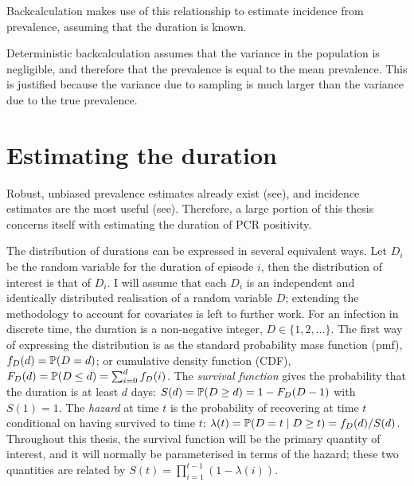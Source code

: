 \documentclass[thesis.tex]{subfiles}
\begin{document}
Backcalculation makes use of this relationship to estimate incidence from prevalence, assuming that the duration is known.

Deterministic backcalculation assumes that the variance in the population is negligible, and therefore that the prevalence is equal to the mean prevalence.
This is justified because the variance due to sampling is much larger than the variance due to the true prevalence.

\section{Estimating the duration}

Robust, unbiased prevalence estimates already exist (see), and incidence estimates are the most useful (see).
Therefore, a large portion of this thesis concerns itself with estimating the duration of PCR positivity.

The distribution of durations can be expressed in several equivalent ways.
Let $D_i$ be the random variable for the duration of episode $i$, then the distribution of interest is that of $D_i$.
I will assume that each $D_i$ is an independent and identically distributed realisation of a random variable $D$; extending the methodology to account for covariates is left to further work.
For an infection in discrete time, the duration is a non-negative integer, \ie $D \in \{1, 2, \dots\}$.
The first way of expressing the distribution is as the standard probability mass function (pmf), $f_{D}(d) = \operatorname{\mathbb{P}}(D = d)$; or cumulative density function (CDF), $F_{D}(d) = \operatorname{\mathbb{P}}(D \leq d) = \sum_{i=0}^d f_{D}(i)$.
The \emph{survival function} gives the probability that the duration is at least $d$ days: $S(d) = \operatorname{\mathbb{P}}(D \geq d) = 1 - F_{D}(D - 1)$ with $S(1) = 1$.
The \emph{hazard} at time $t$ is the probability of recovering at time $t$ conditional on having survived to time $t$: $\lambda(t) = \operatorname{\mathbb{P}}(D = t \mid D \geq t) = f_{D}(d) / S(d)$.
Throughout this thesis, the survival function will be the primary quantity of interest, and it will normally be parameterised in terms of the hazard; these two quantities are related by $S(t) = \prod_{i=1}^{t-1} (1 - \lambda(i))$.
\end{document}
